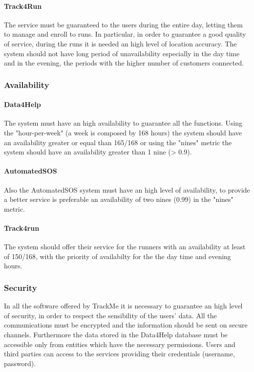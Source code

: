 \documentclass[a4paper]{article}
\begin{document}
\paragraph{Track4Run} The service must be guaranteed to the users during the entire day, letting them to manage and enroll to runs. In particular, in order to guarantee a good quality of service, during the runs it is needed an high level of location accuracy. The system should not have long period of unavailability especially in the day time and in the evening, the periods with the higher number of customers connected.

\vspace{0.5cm}

\subsubsection{Availability}

\paragraph{Data4Help} The system must have an high availability to guarantee all the functions. Using the "hour-per-week"  (a week is composed by 168 hours) the system should have an availability greater or equal than 165/168 or using the "nines" metric the system should have an availability greater than 1 nine (> 0.9).

\paragraph{AutomatedSOS} Also the AutomatedSOS system must have an high level of availability, to provide a better service is preferable an availability of two nines (0.99) in the "nines" metric.

\paragraph{Track4run} The system should offer their service for the runners with an availability at least of 150/168, with the priority of availabilty for the the day time and evening hours.
\clearpage

\subsubsection{Security}

In all the software offered by TrackMe it is necessary to guarantee an high level of security, in order to respect the sensibility of the users' data.
All the communications must be encrypted and the information should be sent on secure channels.
Furthermore the data stored in the Data4Help database must be accessible only from entities which have the necessary permissions. 
Users and third parties can access to the services providing their credentials (username, password). 
\end{document}
